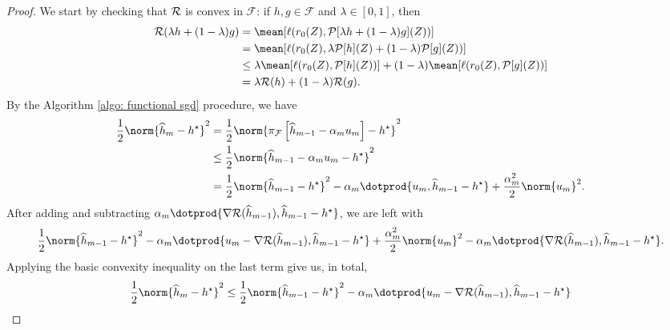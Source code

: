 \begin{proof}
    We start by checking that $ \mathcal{R} $ is convex in $ \mathcal{F} $:
    if $ h, g \in \mathcal{F} $ and $ \lambda \in [ 0, 1 ] $, then
    \begin{align*}
        \risk ( \lambda h + ( 1 - \lambda ) g )
        &= \mean [ \loss ( r_{ 0 } ( Z ), \meanop [ \lambda h + ( 1 - \lambda ) g ] ( Z ) ) ] \\
        &= \mean [ \loss ( r_{ 0 } ( Z ), \lambda \meanop [ h ] ( Z ) + ( 1 - \lambda ) \meanop [ g ] ( Z ) ) ] \\
        &\leq \lambda \mean [ \loss ( r_{ 0 } ( Z ), \meanop [ h ] ( Z ) ) ] + ( 1 - \lambda ) \mean [ \loss ( r_{ 0 } ( Z ), \meanop [ g ] ( Z ) ) ] \\
        &= \lambda \risk ( h ) + ( 1 - \lambda ) \risk ( g )
    .\end{align*}
    By the Algorithm \ref{algo: functional sgd} procedure, we have
    \begin{align*}
        \frac{ 1 }{ 2 } \norm{ \hat{ h }_{ m } - \hstar }^2
        &= \frac{ 1 }{ 2 } \norm{ \pi_{ \mathcal{F} } \left[ \hat{ h }_{ m-1 } - \alpha_{ m } u_{ m } \right] - \hstar }^2 \\
        &\leq \frac{ 1 }{ 2 } \norm{ \hat{ h }_{ m-1 } - \alpha_{ m } u_{ m } - \hstar }^2 \\
        &= \frac{ 1 }{ 2 } \norm{ \hat{ h }_{ m-1 } - \hstar }^2
        - \alpha_{ m } \dotprod{ u_{ m }, \hat{ h }_{ m-1 } - \hstar }
        + \frac{ \alpha_{ m }^2 }{ 2 } \norm{ u_{ m } }^2
    .\end{align*}
    After adding and subtracting $ \alpha_{ m } \dotprod{ \nabla \risk ( \hat{ h }_{ m-1 } ), \hat{ h }_{ m-1 } - \hstar } $, we are left with
    \begin{equation*}
        \frac{ 1 }{ 2 } \norm{ \hat{ h }_{ m-1 } - \hstar }^2
        - \alpha_{ m } \dotprod{ u_{ m } - \nabla \risk ( \hat{ h }_{ m-1 } ), \hat{ h }_{ m-1 } - \hstar }
        + \frac{ \alpha_{ m }^2 }{ 2 } \norm{ u_{ m } }^2
        - \alpha_{ m } \dotprod{ \nabla \risk ( \hat{ h }_{ m-1 } ), \hat{ h }_{ m-1 } - \hstar }
    .\end{equation*}
    Applying the basic convexity inequality on the last term give us, in total,
    \begin{align*}
        \frac{ 1 }{ 2 } \norm{ \hat{ h }_{ m } - \hstar }^2
        &\leq
        \frac{ 1 }{ 2 } \norm{ \hat{ h }_{ m-1 } - \hstar }^2
        - \alpha_{ m } \dotprod{ u_{ m } - \nabla \risk ( \hat{ h }_{ m-1 } ), \hat{ h }_{ m-1 } - \hstar } \\

\end{align*}
\end{proof}
